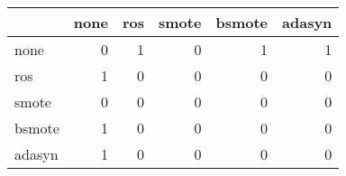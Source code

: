 \begin{tabular}{lrrrrr}
\hline
        &   none &   ros &   smote &   bsmote &   adasyn \\
\hline
 none   &      0 &     1 &       0 &        1 &        1 \\
 ros    &      1 &     0 &       0 &        0 &        0 \\
 smote  &      0 &     0 &       0 &        0 &        0 \\
 bsmote &      1 &     0 &       0 &        0 &        0 \\
 adasyn &      1 &     0 &       0 &        0 &        0 \\
\hline
\end{tabular}